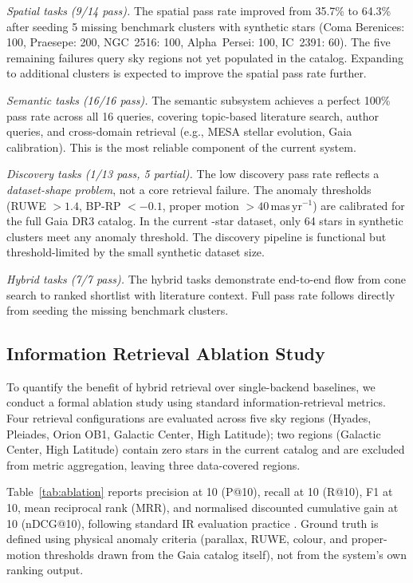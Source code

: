 \documentclass[12pt]{elsarticle}
\begin{document}
\textit{Spatial tasks (9/14 pass).} The spatial pass rate improved from 35.7\% to 64.3\% after seeding 5 missing benchmark clusters with synthetic stars (Coma Berenices: 100, Praesepe: 200, NGC~2516: 100, Alpha~Persei: 100, IC~2391: 60). The five remaining failures query sky regions not yet populated in the catalog. Expanding to additional clusters is expected to improve the spatial pass rate further.

\textit{Semantic tasks (16/16 pass).} The semantic subsystem achieves a perfect 100\% pass rate across all 16 queries, covering topic-based literature search, author queries, and cross-domain retrieval (e.g., MESA stellar evolution, Gaia calibration). This is the most reliable component of the current system.

\textit{Discovery tasks (1/13 pass, 5 partial).} The low discovery pass rate reflects a \emph{dataset-shape problem}, not a core retrieval failure. The anomaly thresholds (RUWE $>1.4$, BP-RP $< -0.1$, proper motion $>40$\,mas\,yr$^{-1}$) are calibrated for the full Gaia DR3 catalog. In the current \nStarsReal{}-star dataset, only 64 stars in synthetic clusters meet any anomaly threshold. The discovery pipeline is functional but threshold-limited by the small synthetic dataset size.

\textit{Hybrid tasks (7/7 pass).} The hybrid tasks demonstrate end-to-end flow from cone search to ranked shortlist with literature context. Full pass rate follows directly from seeding the missing benchmark clusters.

\subsection{Information Retrieval Ablation Study}
\label{sec:ablation}

To quantify the benefit of hybrid retrieval over single-backend baselines, we conduct a formal ablation study using standard information-retrieval metrics. Four retrieval configurations are evaluated across five sky regions (Hyades, Pleiades, Orion OB1, Galactic Center, High Latitude); two regions (Galactic Center, High Latitude) contain zero stars in the current catalog and are excluded from metric aggregation, leaving three data-covered regions.

Table~\ref{tab:ablation} reports precision at 10 (P@10), recall at 10 (R@10), F1 at 10, mean reciprocal rank (MRR), and normalised discounted cumulative gain at 10 (nDCG@10), following standard IR evaluation practice \citep{Manning2008, Jarvelin2002}. Ground truth is defined using physical anomaly criteria (parallax, RUWE, colour, and proper-motion thresholds drawn from the Gaia catalog itself), not from the system's own ranking output.
\end{document}

